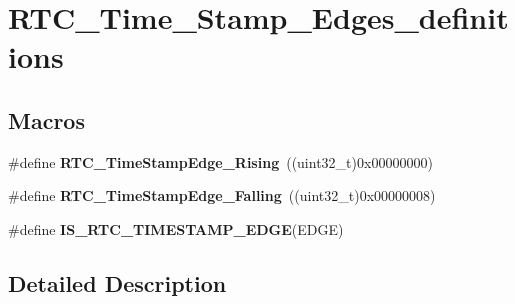 \hypertarget{group___r_t_c___time___stamp___edges__definitions}{\section{R\-T\-C\-\_\-\-Time\-\_\-\-Stamp\-\_\-\-Edges\-\_\-definitions}
\label{group___r_t_c___time___stamp___edges__definitions}
}
\subsection*{Macros}
\begin{DoxyCompactItemize}
\item 
\hypertarget{group___r_t_c___time___stamp___edges__definitions_gac3d8bb0310a1d86a4d1dc80ea6241218}{\#define {\bfseries R\-T\-C\-\_\-\-Time\-Stamp\-Edge\-\_\-\-Rising}~((uint32\-\_\-t)0x00000000)}\label{group___r_t_c___time___stamp___edges__definitions_gac3d8bb0310a1d86a4d1dc80ea6241218}

\item 
\hypertarget{group___r_t_c___time___stamp___edges__definitions_ga786fa99accdef27c983845f2de750357}{\#define {\bfseries R\-T\-C\-\_\-\-Time\-Stamp\-Edge\-\_\-\-Falling}~((uint32\-\_\-t)0x00000008)}\label{group___r_t_c___time___stamp___edges__definitions_ga786fa99accdef27c983845f2de750357}

\item 
\#define {\bfseries I\-S\-\_\-\-R\-T\-C\-\_\-\-T\-I\-M\-E\-S\-T\-A\-M\-P\-\_\-\-E\-D\-G\-E}(E\-D\-G\-E)
\end{DoxyCompactItemize}


\subsection{Detailed Description}


